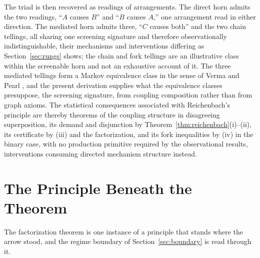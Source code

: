 \documentclass[11pt]{article}
\begin{document}
The triad is then recovered as readings of arrangements. The direct horn admits the two readings, ``$A$ causes $B$'' and ``$B$ causes $A$,'' one arrangement read in either direction. The mediated horn admits three, ``$C$ causes both'' and the two chain tellings, all sharing one screening signature and therefore observationally indistinguishable, their mechanisms and interventions differing as Section~\ref{sec:rungs} shows; the chain and fork tellings are an illustrative class within the screenable horn and not an exhaustive account of it. The three mediated tellings form a Markov equivalence class in the sense of Verma and Pearl \cite{verma1990equivalence, spirtes2000causation, pearl2009causality}, and the present derivation supplies what the equivalence classes presuppose, the screening signature, from coupling composition rather than from graph axioms. The statistical consequences associated with Reichenbach's principle are thereby theorems of the coupling structure in disagreeing superposition, its demand and disjunction by Theorem~\ref{thm:reichenbach}(i)--(ii), its certificate by (iii) and the factorization, and its fork inequalities by (iv) in the binary case, with no production primitive required by the observational results, interventions consuming directed mechanism structure instead.

\section{The Principle Beneath the Theorem}\label{sec:principle}

The factorization theorem is one instance of a principle that stands where the arrow stood, and the regime boundary of Section~\ref{sec:boundary} is read through it.
\end{document}

